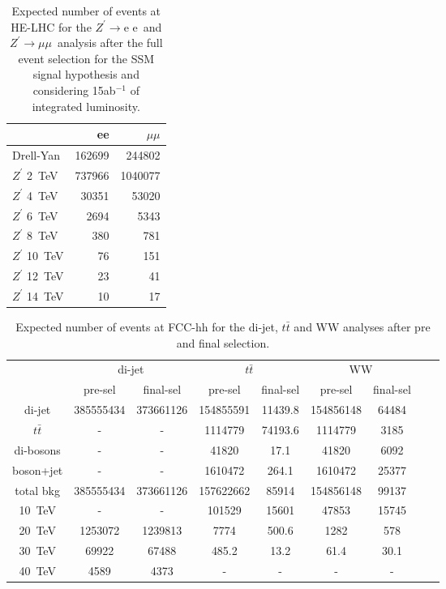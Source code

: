\documentclass[a4paper,11pt]{article}
\newcommand{\Zp}{\ensuremath{Z^{\prime}}}
\newcommand*{\Zpee}{\ensuremath{Z^{\prime}\rightarrow \text{e e}}}
\newcommand*{\Zpmumu}{\ensuremath{Z^{\prime}\rightarrow \mu\mu}}
\newcommand*{\ttbar}{\ensuremath{t\bar{t}}}
\begin{document}
\begin{table}[!htb]
   \centering
\begin{tabular}{|l|r|r|}
  \hline
  \hline
 & ee & $\mu\mu$  \\
  \hline
  Drell-Yan    & 162699 &  244802 \\
  \hline
  $\Zp$ 2~TeV  & 737966 & 1040077 \\
  $\Zp$ 4~TeV  &  30351 &   53020 \\
  $\Zp$ 6~TeV  &   2694 &    5343 \\
  $\Zp$ 8~TeV  &    380 &     781 \\
  $\Zp$ 10~TeV &     76 &     151 \\
  $\Zp$ 12~TeV &     23 &      41 \\
  $\Zp$ 14~TeV &     10 &      17 \\
  \hline
  \hline
\end{tabular}
  \caption{Expected number of events at HE-LHC for the \Zpee\ and \Zpmumu\ analysis after the full event selection for the SSM signal hypothesis and considering 15ab$^{-1}$ of integrated luminosity.}
  \label{tab:leptonicresonances27:yieldsll}
\end{table}


\begin{table}[htbp]
   \centering
\begin{tabular}{|c|c|c|c|c|c|c|c|c|}
  \hline
  \hline
  & \multicolumn{2}{c|}{di-jet}  & \multicolumn{2}{c|}{$\ttbar$} & \multicolumn{2}{c|}{WW} \\
  \cline{2-7}

 & pre-sel & final-sel  & pre-sel & final-sel & pre-sel & final-sel\\
  \hline
  di-jet & 385555434 &  373661126 &  154855591 & 11439.8&  154856148 & 64484\\
  $\ttbar$ & - & - & 1114779 & 74193.6 &  1114779 & 3185\\
  di-bosons & - & - &  41820 &  17.1 &  41820 & 6092\\
  boson+jet & - & - & 1610472 & 264.1&  1610472 & 25377\\
  \hline
  total bkg  &  385555434& 373661126& 157622662 & 85914 & 154856148 & 99137\\
  \hline
  10~TeV &  - & - &  101529 & 15601 &  47853 & 15745\\
  20~TeV &   1253072 &  1239813& 7774 & 500.6 & 1282 & 578\\
  30~TeV &  69922 &  67488 & 485.2 & 13.2 &  61.4 & 30.1 \\
  40~TeV &  4589 &  4373 & - & - & - & -\\
  \hline
  \hline
\end{tabular}
  \caption{Expected number of events at FCC-hh for the di-jet, $\ttbar$ and WW analyses after pre and final selection.}
  \label{tab:hadronicresonances:yields}
\end{table}
\end{document}

